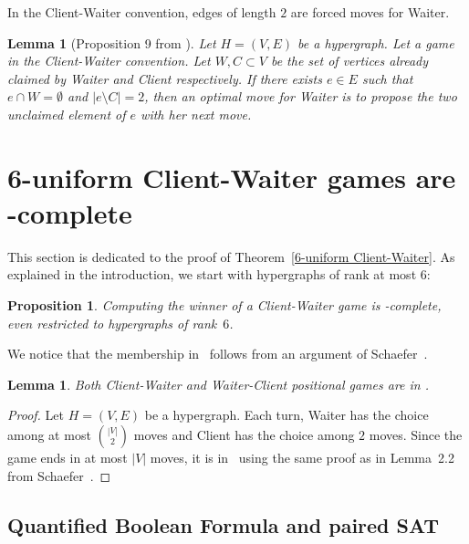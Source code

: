 \documentclass{article}
\newcommand{\hyp}{H}
\newcommand{\WS}{E}
\newcommand{\som}{V}
\newcommand{\hxf}{\hyp = (\som, \WS)}
\newcommand{\hedges}{edges\xspace}
\newtheorem{lemma}[theorem]{Lemma}
\newtheorem{proposition}[theorem]{Proposition}
\begin{document}
In the Client-Waiter convention, \hedges of length \(2\) are forced moves for Waiter.

\begin{lemma}[Proposition 9 from \cite{CMP09}]
\label{lem:size2hyperedge}
Let $\hxf$ be a hypergraph. Let a game in the Client-Waiter convention. Let $W,C \subset \som$ be the set of vertices already claimed by Waiter and Client respectively. If there exists $e\in \WS$ such that $e \cap W = \emptyset$ and $|e \setminus C| = 2$, then an optimal move for Waiter is to propose the two unclaimed element of $e$ with her next move.
\end{lemma}














\section{6-uniform Client-Waiter games are \PSPACE-complete} \label{sec: 6unif client-waiter}

This section is dedicated to the proof of Theorem~\ref{6-uniform Client-Waiter}. As explained in the introduction, we start with hypergraphs of rank at most \(6\):
\begin{proposition}\label{prop: Client-Waiter pspace complete}
    Computing the winner of a Client-Waiter game is \PSPACE-complete, even restricted to hypergraphs of rank~$6$.
\end{proposition}

We notice that the membership in \PSPACE\ follows from an argument of Schaefer~\cite{Sch78}.
\begin{lemma}\label{lemma: in pspace}
     Both Client-Waiter and Waiter-Client positional games are in \PSPACE{}.
\end{lemma}

\begin{proof} 
Let $H = (V,E)$ be a hypergraph. Each turn, Waiter has the choice among at most $\binom{|V|}{2}$ moves and Client has the choice among $2$ moves. Since the game ends in at most $|V|$ moves, it is in \PSPACE\  using the same proof as in Lemma~2.2 from Schaefer~\cite{Sch78}.
\end{proof}

\subsection{Quantified Boolean Formula and paired SAT}
\label{sec:PairedSAT}
\end{document}
